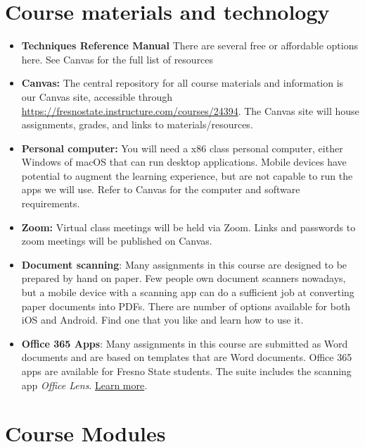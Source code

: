 \hypertarget{course-materials-and-technology}{%
\section{Course materials and
technology}\label{course-materials-and-technology}}

\begin{itemize}
\tightlist
\item
  \textbf{Techniques Reference Manual} There are several free or
  affordable options here. See Canvas for the full list of resources
\item
  \textbf{Canvas:} The central repository for all course materials and
  information is our Canvas site, accessible through
  \url{https://fresnostate.instructure.com/courses/24394}. The Canvas
  site will house assignments, grades, and links to materials/resources.
\item
  \textbf{Personal computer:} You will need a x86 class personal
  computer, either Windows of macOS that can run desktop applications.
  Mobile devices have potential to augment the learning experience, but
  are not capable to run the apps we will use. Refer to Canvas for the
  computer and software requirements.
\item
  \textbf{Zoom:} Virtual class meetings will be held via Zoom. Links and
  passwords to zoom meetings will be published on Canvas.
\item
  \textbf{Document scanning}: Many assignments in this course are
  designed to be prepared by hand on paper. Few people own document
  scanners nowadays, but a mobile device with a scanning app can do a
  sufficient job at converting paper documents into PDFs. There are
  number of options available for both iOS and Android. Find one that
  you like and learn how to use it.
\item
  \textbf{Office 365 Apps}: Many assignments in this course are
  submitted as Word documents and are based on templates that are Word
  documents. Office 365 apps are available for Fresno State students.
  The suite includes the scanning app \emph{Office Lens}.
  \href{https://help.fresnostate.edu/students/software/office365.php}{Learn
  more}.
\end{itemize}

\hypertarget{course-modules}{%
\section{Course Modules}\label{course-modules}}

